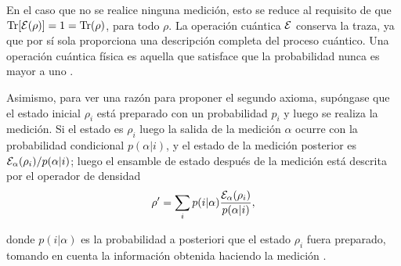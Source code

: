 En el caso que no se realice ninguna medición, esto se reduce al requisito de que ${\rm Tr}[\mathcal{E}(\rho)] = 1 = {\rm Tr}(\rho)$, para todo $\rho$. La operación cuántica $\mathcal{E}$ conserva la traza, ya que por sí sola proporciona una descripción completa del proceso cuántico. Una operación cuántica física es aquella que satisface que la probabilidad nunca es mayor a uno {\cite{nielsen_chuang_2010}}.

\begin{comment}
Asimismo, una razón para proponer el segundo axioma, es que se espera que la evolución de un estado cuántico sea lineal debido a que de esa forma es compatible con la interpretación del operador de densidad como un ensamble de posibles estados. Supóngase que $\E$ mapea al estado inicial $\rho$  en el tiempo $t=0$ al estado final al tiempo $t=T$, el estado $\rho_i$ es preparado con una probabilidad $p_i$. Luego el estado de evolución temporal en $t = T$ será $\E(\rho_i )$ con probabilidad $p_i$, por lo tanto el estado final $\rho'$ evoluciona como \begin{equation}
\rho'= \sum_i p_i \E (\rho_i).
\end{equation}

Por otro lado, el estado inicial es descrito por $\sum_i p_i \rho$, que evoluciona así 
\begin{equation}
    \rho'= \E\left(\sum_i p_i \rho_i\right).
\end{equation} Igualando las dos ecuaciones anteriores, se tiene  que $\E$ debe actuar linealmente, en combinaciones convexas de estados {\cite{preskill2020quantum}}.
\end{comment}

Asimismo, para ver una razón para proponer el segundo axioma, supóngase que el estado inicial $\rho_i$ está preparado con un probabilidad $p_i$ y luego se realiza la medición. Si el estado es $\rho_i $ luego la salida de la medición  $\alpha$ ocurre con la probabilidad condicional $p(\alpha|i)$, y el estado de la medición  posterior es $\mathcal{E}_\alpha(\rho_i)/p(\alpha|i)$; luego el ensamble de estado después de la medición está descrita por el operador de densidad 
\begin{equation}\label{lineal_y_convexo}
    \rho'=\sum_i p(i|\alpha)\dfrac{\mathcal{E}_\alpha(\rho_i)}{p(\alpha|i)},
\end{equation}

donde $p(i|\alpha)$ es la probabilidad a posteriori que el estado $\rho_i$ fuera preparado, tomando en cuenta la información obtenida haciendo la medición {\cite{preskill2020quantum}}. 

